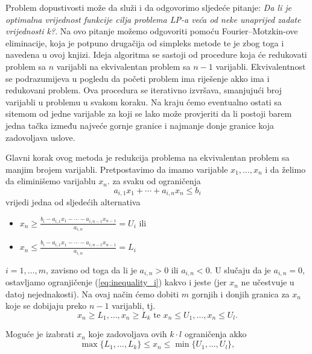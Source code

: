 \documentclass[a4paper, utf8, 11pt, colorlinks]{book}
\begin{document}
Problem dopustivosti može da služi i da odgovorimo sljedeće pitanje: 
\emph{Da li je optimalna vrijednost funkcije cilja problema LP-a veća od neke unaprijed zadate  vrijednosti k?}.
 Na ovo pitanje možemo odgovoriti pomoću Fourier–Motzkin-ove eliminacije, koja je potpuno drugačija od simpleks metode te je zbog toga i navedena u ovoj knjizi. Ideja algoritma se sastoji od procedure koja će redukovati problem sa $n$ varijabli na ekvivalentan problem sa $n-1$ varijabli. Ekvivalentnost se podrazumijeva u pogledu da početi problem ima riješenje akko ima i redukovani problem. Ova procedura se iterativno izvršava, smanjujući broj varijabli u problemu u svakom koraku. Na kraju ćemo eventualno ostati sa sitemom od jedne varijable za koji se lako može provjeriti da li postoji barem jedna tačka između najveće gornje granice i najmanje donje granice koja zadovoljava uslove. 
 
 Glavni korak ovog metoda je redukcija problema na ekvivalentan problem sa manjim brojem varijabli. Pretpostavimo da imamo varijable $x_1,\ldots, x_n$ i da želimo da eliminišemo varijablu $x_n$. za svaku od ograničenja
 \begin{equation}\label{eq:inequality_i}
      a_{i,1} x_1 + \cdots + a_{i,n} x_n \leq b_i
 \end{equation}
 vrijedi jedna od sljedećih alternativa 
 \begin{itemize}
 	 \item  $x_n \geq \frac{b_i - a_{i,1}x_1- \cdots - a_{i, n-1} x_{n-1} }{a_{i,n}}=U_i$ ili 
 	 \item   $x_n \leq \frac{b_i - a_{i,1}x_1- \cdots - a_{i, n-1} x_{n-1} }{a_{i,n}}=L_i$
 \end{itemize}
 $i=1,\ldots, m$, zavisno od toga da li je $a_{i,n} >0$ ili $a_{i,n} <0$. U slučaju da je $a_{i,n} = 0$,  ostavljamo  ogranjičenje (\ref{eq:inequality_i}) kakvo i jeste (jer $x_n$ ne učestvuje u datoj nejednakosti). Na ovaj način ćemo dobiti $m$ gornjih i donjih granica za $x_n$ koje se dobijaju preko $n-1$ varijabli, tj. 
 $$  x_n \geq L_1, \ldots, x_n\geq L_k \mbox{ te }  x_n \leq U_1, \ldots, x_n \leq U_l.$$
  
 Moguće je izabrati $x_n$ koje zadovoljava ovih $k \cdot l$ ograničenja akko 
 \begin{equation}\label{eq:min_max_xi}
     \max\{L_1,\ldots, L_k \} \leq x_n \leq \min \{ U_1, \ldots, U_l \},
   \end{equation}
   
\end{document}

